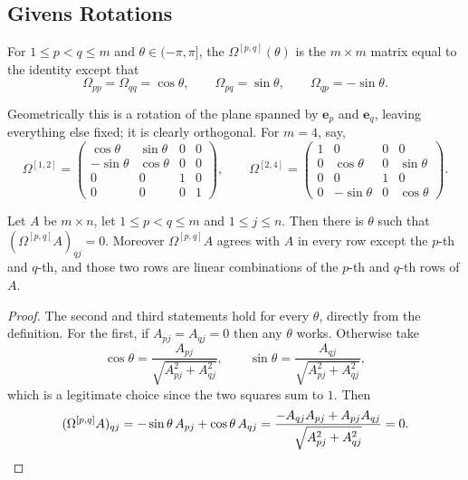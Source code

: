 \documentclass[a4paper]{scrartcl}
\begin{document}
\subsection{Givens Rotations}

\begin{definition}
  For $1 \leq p < q \leq m$ and $\theta \in (-\pi,\pi]$, the  $\Omega^{[p,q]}(\theta)$ is the $m\times m$ matrix equal to the identity except that
  $$
  \Omega_{pp} = \Omega_{qq} = \cos\theta, \qquad \Omega_{pq} = \sin\theta, \qquad \Omega_{qp} = -\sin\theta.
  $$
\end{definition}

Geometrically this is a rotation of the plane spanned by $\mathbf{e}_p$ and $\mathbf{e}_q$, leaving everything else fixed; it is clearly orthogonal. For $m = 4$, say,
$$
\Omega^{[1,2]} = \begin{pmatrix}\cos\theta & \sin\theta & 0&0\\ -\sin\theta&\cos\theta&0&0\\0&0&1&0\\0&0&0&1\end{pmatrix}, \qquad
\Omega^{[2,4]} = \begin{pmatrix}1&0&0&0\\0&\cos\theta&0&\sin\theta\\0&0&1&0\\0&-\sin\theta&0&\cos\theta\end{pmatrix}.
$$

\begin{proposition}\label{prop:givens}
  Let $A$ be $m\times n$, let $1 \leq p < q \leq m$ and $1\leq j \leq n$. Then there is $\theta$ such that $(\Omega^{[p,q]}A)_{qj} = 0$. Moreover $\Omega^{[p,q]}A$ agrees with $A$ in every row except the $p$-th and $q$-th, and those two rows are linear combinations of the $p$-th and $q$-th rows of $A$.
\end{proposition}
\begin{proof}
  The second and third statements hold for every $\theta$, directly from the definition. For the first, if $A_{pj} = A_{qj} = 0$ then any $\theta$ works. Otherwise take
  $$
  \cos\theta = \frac{A_{pj}}{\sqrt{A_{pj}^2 + A_{qj}^2}}, \qquad \sin\theta = \frac{A_{qj}}{\sqrt{A_{pj}^2 + A_{qj}^2}},
  $$
  which is a legitimate choice since the two squares sum to $1$. Then
  $$
  (\Omega^{[p,q]}A)_{qj} = -\sin\theta\, A_{pj} + \cos\theta\, A_{qj} = \frac{-A_{qj}A_{pj} + A_{pj}A_{qj}}{\sqrt{A_{pj}^2+A_{qj}^2}} = 0. \qedhere
  $$
\end{proof}
\end{document}
